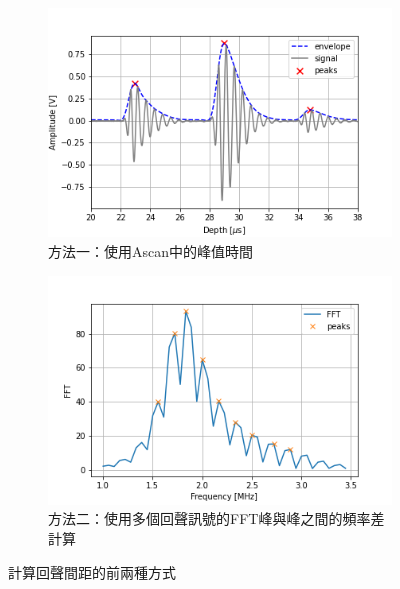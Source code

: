 \documentclass[12pt]{report}
\begin{document}

\begin{figure}[h]
    \centering
    \begin{subfigure}{0.49\textwidth}
        \centering
        \includegraphics[width=\textwidth]{PHY05_ascan.png}
        \caption{方法一：使用Ascan中的峰值時間}
        \label{fig:05a}
    \end{subfigure}
    \hfill
    \begin{subfigure}{0.49\textwidth}
        \centering
        \includegraphics[width=\textwidth]{PHY05_fft.png}
        \caption{方法二：使用多個回聲訊號的FFT峰與峰之間的頻率差計算}
        \label{fig:05f}
    \end{subfigure}
    \caption{計算回聲間距的前兩種方式}
\end{figure}
\end{document}
